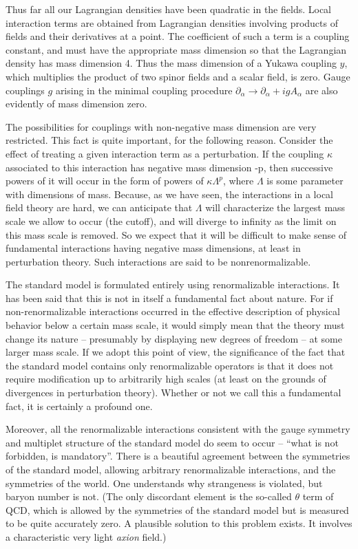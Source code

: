 \documentclass[aps,epsf]{revtex4}
\begin{document}
Thus far all our Lagrangian
densities have been quadratic in the fields. Local interaction terms
are obtained from Lagrangian densities involving products of fields
and their derivatives at a point.   The coefficient of such a term is
a coupling constant, and must have the appropriate mass dimension so
that  the Lagrangian density has mass dimension 4.  Thus the mass
dimension of  a Yukawa coupling $y$, which multiplies the product of
two spinor fields and a scalar field, is zero.   Gauge couplings $g$
arising in the minimal coupling procedure $\partial_\alpha \rightarrow
\partial_\alpha + i g A_\alpha$ are also evidently of mass dimension
zero.    

The possibilities for couplings with non-negative mass
dimension are very restricted. This fact is quite important, for
the following reason.  Consider the effect of treating a given
interaction term as a perturbation.  If the coupling $\kappa$
associated to this interaction has negative mass dimension -p, then
successive powers of it will occur in the form of powers of 
$\kappa \Lambda^p$,
where $\Lambda$ is some parameter with dimensions of mass.  Because,
as we have seen, the interactions in a local field theory are hard, we
can anticipate that $\Lambda$ will characterize the largest mass scale
we allow to occur (the cutoff),   and will diverge to infinity as the
limit on this mass scale is removed.  So we expect that it will be
difficult to make sense of fundamental interactions having negative
mass dimensions, at least in perturbation theory.  Such interactions
are said to be nonrenormalizable.   

The standard model is formulated
entirely using renormalizable interactions.    It has been said that
this is not in itself a fundamental fact about nature.  For if
non-renormalizable interactions occurred in the effective description
of physical behavior below a certain mass scale, it would simply mean
that the theory must change its nature -- presumably by displaying new
degrees of freedom --  at some larger mass scale.   If we adopt this
point of view, the significance of the fact that the standard model
contains only renormalizable operators is that it does not require
modification up to arbitrarily high scales (at least on the grounds of
divergences in perturbation theory).    
Whether or not we call this a fundamental fact, it is certainly a
profound one.  

Moreover, all the renormalizable interactions
consistent with the gauge symmetry and multiplet structure of the
standard model do seem to occur -- ``what is not forbidden, is
mandatory''.   There is a beautiful agreement between the symmetries
of the standard model, allowing arbitrary renormalizable interactions,
and the symmetries of the world.  One understands why strangeness is
violated, but baryon number is not.  (The only discordant element  is
the so-called $\theta$ term of QCD, which is allowed by the symmetries
of the standard model but is measured to be quite accurately zero.   
A plausible solution to this problem exists.  It involves a
characteristic very light {\it axion\/} field.) 
\end{document}
